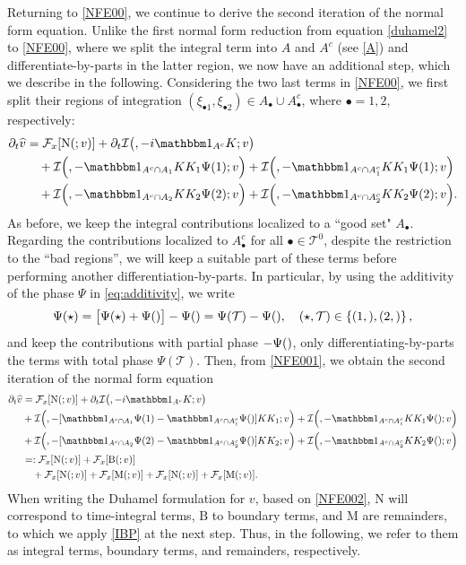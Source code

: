 \documentclass[a4paper,
11pt,  reqno]{amsart}
\makeatletter
\newcommand{\5}{\textup{V}}
\newcommand{\ft}{\widehat}
\newcommand{\ind}{\mathbbm 1}
\newcommand{\dt}{\partial_t}
\theoremstyle{remark}
\newcommand{\bul}{\bullet}
\newcommand{\TT}{\mathcal{T}}
\newcommand{\Ft}{{\mathcal{F}}}
\def\<#1>{\csname MH@symb@#1\endcsname}
\newcommand{\Ical}{\mathcal{I}}
\numberwithin{equation}{section}
\numberwithin{theorem}{section}
\newcommand{\MM}{\mathrm{M}}
\newcommand{\NN}{\mathrm{N}}
\newcommand{\BB}{\mathrm{B}}
\makeatother
\begin{document}
Returning to \eqref{NFE00}, we continue to derive the second iteration of the normal form equation.
Unlike the first normal form reduction from equation \eqref{duhamel2} to \eqref{NFE00}, where we split the integral term into $A$ and $A^c$ (see \eqref{A}) and differentiate-by-parts in the latter region, we now have an additional step, which we describe in the following. Considering the two last terms in \eqref{NFE00}, we first split their regions of integration $(\xi_{\bul1}, \xi_{\bul2}) \in A_\bul \cup A_\bul^c$, where $\bul = 1,2$, respectively:
\begin{align}
\label{NFE001}
\dt\ft v
&
=
 \Ft_x[ \NN ( \<1>; v )]
+
\dt \Ical \big( \<1>, -i  \ind_{A^c} K; v \big)
\\
&
\quad
+
\Ical \Big( \<21>, - \ind_{A^c \cap A_1} KK_1\Psi(1) ; v  \Big)
+
\Ical \Big( \<21>, - \ind_{A^c \cap A_1^c} KK_1\Psi(1) ; v  \Big)
\\
&
\quad
+
\Ical \Big( \<22>, - \ind_{A^c \cap A_2} KK_2\Psi(2) ; v  \Big)
+
\Ical \Big( \<22>, - \ind_{A^c \cap A_2^c} KK_2\Psi(2) ; v  \Big) .
\end{align}
As before, we keep the integral contributions localized to a ``good set" $A_\bul$. Regarding the contributions localized to $A_\bul^c$ for all $\bul\in \TT^0$, despite the restriction to the ``bad regions'', we will keep a suitable part of these terms before performing another differentiation-by-parts. In particular, by using the additivity of the phase $\Psi$ in \eqref{eq:additivity}, we write
\begin{align}
\Psi(\star)
= \big[ \Psi(\star) + \Psi(\<1>) \big]- \Psi(\<1>)
=
\Psi(\TT) - \Psi(\<1>),
\quad (\star, \TT)\in \left\{ (1, \<21>) , (2, \<22>) \right\},
\end{align}
and keep the contributions with partial phase $-\Psi(\<1>)$, only differentiating-by-parts the terms with total phase $\Psi(\TT)$. Then, from \eqref{NFE001}, we obtain the second iteration of the normal form equation
\begin{align}
\dt\ft v
&
=
 \Ft_x[ \NN ( \<1>; v )]
+
\dt \Ical \big( \<1>, - i  \ind_{A^c} K; v \big)
\\
&
+
\Ical \Big( \<21>, -[ \ind_{A^c \cap A_1} \Psi(1) - \ind_{A^c \cap A_1^c} \Psi(\<1>)  ]KK_1 ; v  \Big)
+
\Ical \Big( \<21>, - \ind_{A^c \cap A_1^c} KK_1\Psi(\<21>) ; v  \Big)
\\
&
+
\Ical \Big( \<22>, - [\ind_{A^c \cap A_2} \Psi(2) - \ind_{A^c \cap A_2^c} \Psi(\<1>)  ] KK_2; v  \Big)
+
\Ical \Big( \<22>, - \ind_{A^c \cap A_2^c} KK_2\Psi(\<22>) ; v  \Big)
\\
&
= :
 \Ft_x[ \NN ( \<1>; v )]
+
 \Ft_x[
\BB(\<1>;v)
]
\\
&
\quad
+
 \Ft_x[
\NN(\<21>; v )
]
+
 \Ft_x[
\MM(\<21>; v )
]
+
 \Ft_x[
\NN(\<22>; v)
]
+
 \Ft_x[
\MM(\<22>;v)
]
.
\label{NFE002}
\end{align}
When writing the Duhamel formulation for $v$, based on \eqref{NFE002}, $\NN$ will correspond to time-integral terms, $\BB$ to boundary terms, and $\MM$ are remainders, to which we apply \eqref{IBP} at the next step. Thus, in the following, we refer to them as integral terms, boundary terms, and remainders, respectively.
\end{document}
